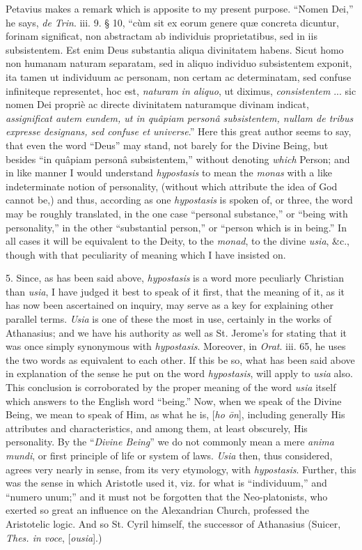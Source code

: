 Petavius makes a remark which is apposite to my present purpose.
``Nomen Dei,'' he says, \emph{de Trin}. iii. 9. § 10, ``cùm
sit ex eorum genere quæ concreta dicuntur, forinam significat, non
abstractam ab individuis proprietatibus, sed in iis subsistentem. Est
enim Deus substantia aliqua divinitatem habens. Sicut homo non humanam
naturam separatam, sed in aliquo individuo subsistentem exponit, ita
tamen ut individuum ac personam, non certam ac determinatam, sed
confuse infiniteque representet, hoc est, \emph{naturam in aliquo}, ut
diximus, \emph{consistentem} ... sic nomen Dei propriè ac
directe divinitatem naturamque divinam indicat, \emph{assignificat autem
eundem, ut in quâpiam personâ subsistentem, nullam de tribus
expresse designans, sed confuse et universe}.'' Here this great
author seems to say, that even the word ``Deus'' may stand,
not barely for the Divine Being, but besides ``in quâpiam
personâ subsistentem,'' without denoting \emph{which} Person; and
in like manner I would understand \emph{hypostasis} to mean the \emph{monas}
with a like indeterminate notion of personality, (without which
attribute the idea of God cannot be,) and thus, according as one \emph{hypostasis}
is spoken of, or three, the word may be roughly translated, in the one
case ``personal substance,'' or ``being with
personality,'' in the other ``substantial person,'' or
``person which is in being.'' In all cases it will be
equivalent to the Deity, to the \emph{monad}, to the divine \emph{usia},
\&c., though with that peculiarity of meaning which I have insisted
on.

5. Since, as has been said above, \emph{hypostasis} is a word more
peculiarly Christian than \emph{usia}, I have judged it best to speak
of it first, that the meaning of it, as it has now been ascertained on
inquiry, may serve as a key for explaining other parallel terms. \emph{Usia}
is one of these the most in use, certainly in the works of Athanasius;
and we have his authority as well as St. Jerome's for stating that it
was once simply synonymous with \emph{hypostasis}. Moreover, in \emph{Orat}.
iii. 65, he uses the two words as equivalent to each other. If this be
so, what has been said above in explanation of the sense he put on the
word \emph{hypostasis}, will apply to \emph{usia} also. This
conclusion is corroborated by the proper meaning of the word \emph{usia}
itself which answers to the English word ``being.'' Now, when
we speak of the Divine Being, we mean to speak of Him, as what he is,
[\emph{ho \={o}n}], including generally His attributes and
characteristics, and among them, at least obscurely, His personality.
By the ``\emph{Divine Being}'' we do not commonly mean a mere \emph{anima
mundi}, or first principle of life or system of laws. \emph{Usia}
then, thus considered, agrees very nearly in sense, from its very
etymology, with \emph{hypostasis}. Further, this was the sense in
which Aristotle used it, viz. for what is ``individuum,'' and
``numero unum;'' and it must not be forgotten that the Neo-platonists,
who exerted so great an influence on the Alexandrian Church, professed
the Aristotelic logic. And so St. Cyril himself, the successor of
Athanasius (Suicer, \emph{Thes. in voce}, [\emph{ousia}].)

